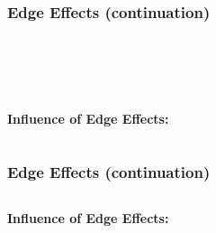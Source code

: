 \documentclass[svgnames] {beamer}
\begin{document}
\begin{frame}

  \frametitle{Edge Effects (continuation)}
  
  \begin{center}
    \begin{figure}[H]
      \centering
      \begin{minipage}[h]{0.4\linewidth}
        \\	
      \end{minipage}
      \begin{minipage}[h]{0.4\linewidth}
        \\
      \end{minipage}
    \end{figure}
  \end{center}
  
  \begin{columns}[c]
    \begin{block}{\textbf {Influence of Edge Effects:}}
      \begin{center}
        {}
      \end{center}
    \end{block}
  \end{columns}
\end{frame}

\begin{frame}

  \frametitle{Edge Effects (continuation)}
  
  \begin{columns}[c]
    \begin{block}{\textbf {Influence of Edge Effects:}}
      \begin{center}
        {}
      \end{center}
    \end{block}
  \end{columns}

 \begin{figure}[H]
    \centering
    \begin{minipage}[h]{0.4\linewidth}
      \\	
    \end{minipage}
    \begin{minipage}[h]{0.4\linewidth}
      \\
    \end{minipage}
    \end{figure}

 
\end{frame}
\end{document}
